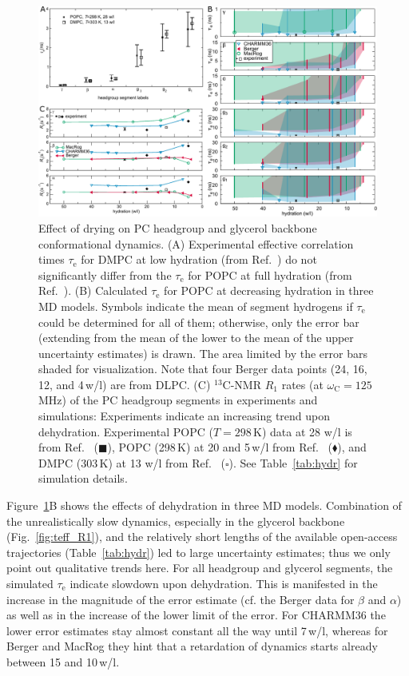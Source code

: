 \documentclass[journal=jcisd8,manuscript=article,layout=twocolumn]{achemso}
\begin{document}
\begin{figure}[ht!]
\centering
\includegraphics[width=\textwidth]{../Figs/hydration_2columns2.pdf} 

\caption{Effect of drying on PC headgroup and glyc\-er\-ol backbone conformational dynamics.
(A) Experimental effective correlation times $\tau_\mathrm e$ for
DMPC at low hydration %
(from Ref.~)
do not significantly differ from the
$\tau_\mathrm e$ for POPC at full hydration (from Ref.~). %
(B) Calculated $\tau_\mathrm e$  for
POPC at decreasing hydration in three MD models.
Symbols indicate the mean of segment hydrogens
if $\tau_\mathrm{e}$ could be determined for all of them; otherwise, only the error bar
(extending from the mean of the lower to the mean of the upper uncertainty estimates) is drawn.
The area limited by the error bars shaded for visualization.
Note that four Berger data points (24, 16, 12, and 4\,w/l) are from DLPC.
(C) $^{13}$C-NMR $R_1$ rates (at $\omega_\mathrm C=125$\,MHz) of the PC headgroup segments
in experiments and simulations: Experiments indicate an increasing trend upon dehydration. Experimental POPC ($T=298$\,K) data at 28 w/l is from Ref.~ ($\blacksquare$), POPC (298\,K) at 20 and 5\,w/l from Ref.~ ($\blacklozenge$), and DMPC (303\,K) at 13 w/l from Ref.~ ($\square$). 
See Table~\ref{tab:hydr} for simulation details.}
\label{fig:hydration}
\end{figure}

Figure~\ref{fig:hydration}B shows the effects of dehydration in three MD models.
Combination of
the unrealistically slow dynamics, especially in the glycerol backbone (Fig.~\ref{fig:teff_R1}), and
the relatively short lengths of the available open-access trajectories %
(Table~\ref{tab:hydr})
led to large uncertainty estimates; %
thus we only point out qualitative trends here. For all headgroup and glycerol segments, the simulated  $\tau_\mathrm e$ indicate slowdown upon dehydration. This is manifested in the increase in the magnitude of the error estimate (cf. the Berger data for $\beta$ and $\alpha$) as well as in the increase of the lower limit of the error. 
For CHARMM36 the lower error estimates stay almost constant all the way until 7\,w/l, whereas for Berger and MacRog they hint that a retardation of dynamics starts already between 15 and 10\,w/l.
\end{document}
